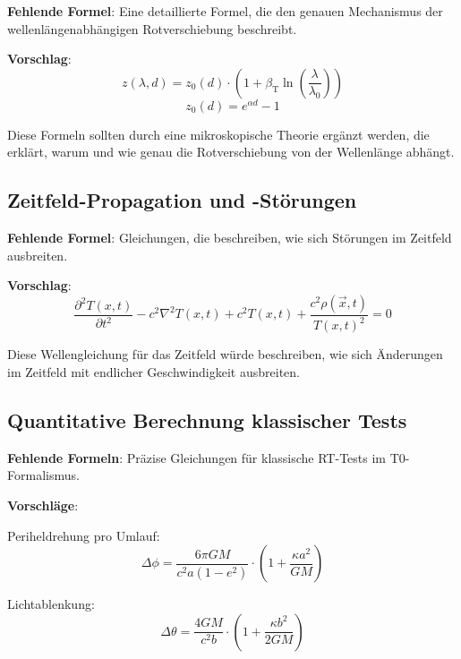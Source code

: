 \documentclass[12pt,a4paper]{article}
\newcommand{\Tfieldt}{T(x,t)}
\newcommand{\betaT}{\beta_{\text{T}}}
\newcommand{\vecx}{\vec{x}}
\begin{document}
	\textbf{Fehlende Formel}: Eine detaillierte Formel, die den genauen Mechanismus der wellenlängenabhängigen Rotverschiebung beschreibt.
	
	\textbf{Vorschlag}:
	\begin{equation}
		z(\lambda,d) = z_0(d) \cdot \left(1 + \betaT \ln\left(\frac{\lambda}{\lambda_0}\right)\right)
	\end{equation}
	\begin{equation}
		z_0(d) = e^{\alpha d} - 1
	\end{equation}
	
	Diese Formeln sollten durch eine mikroskopische Theorie ergänzt werden, die erklärt, warum und wie genau die Rotverschiebung von der Wellenlänge abhängt.
	
	\subsection{Zeitfeld-Propagation und -Störungen}
	\label{subsec:field_propagation}
	
	\textbf{Fehlende Formel}: Gleichungen, die beschreiben, wie sich Störungen im Zeitfeld ausbreiten.
	
	\textbf{Vorschlag}:
	\begin{equation}
		\frac{\partial^2\Tfieldt}{\partial t^2} - c^2\nabla^2\Tfieldt + c^2\Tfieldt + \frac{c^2\rho(\vecx,t)}{\Tfieldt^2} = 0
	\end{equation}
	
	Diese Wellengleichung für das Zeitfeld würde beschreiben, wie sich Änderungen im Zeitfeld mit endlicher Geschwindigkeit ausbreiten.
	
	\subsection{Quantitative Berechnung klassischer Tests}
	\label{subsec:classical_tests}
	
	\textbf{Fehlende Formeln}: Präzise Gleichungen für klassische RT-Tests im T0-Formalismus.
	
	\textbf{Vorschläge}:
	
	Periheldrehung pro Umlauf:
	\begin{equation}
		\Delta\phi = \frac{6\pi GM}{c^2a(1-e^2)} \cdot \left(1 + \frac{\kappa a^2}{GM}\right)
	\end{equation}
	
	Lichtablenkung:
	\begin{equation}
		\Delta\theta = \frac{4GM}{c^2b} \cdot \left(1 + \frac{\kappa b^2}{2GM}\right)
	\end{equation}
	
\end{document}
